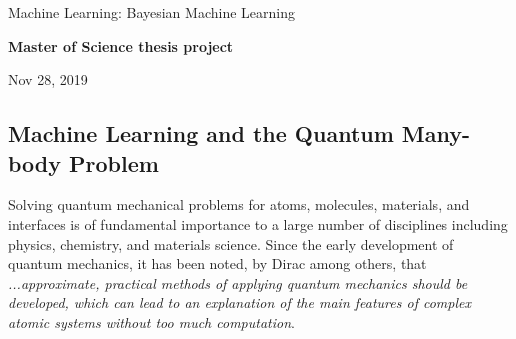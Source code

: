 \documentclass[%
oneside,                 %
final,                   %
10pt]{article}
\begin{document}

\newcommand{\exercisesection}[1]{\subsection*{#1}}






\thispagestyle{empty}

\begin{center}
{\LARGE\bf
\begin{spacing}{1.25}
Machine Learning: Bayesian Machine Learning
\end{spacing}
}
\end{center}


\begin{center}
{\bf Master of Science thesis project${}^{}$} \\ [0mm]
\end{center}

\begin{center}
\end{center}
    

\begin{center}
Nov 28, 2019
\end{center}

\vspace{1cm}


\subsection*{Machine Learning and the Quantum Many-body Problem}

Solving quantum mechanical problems for atoms,  molecules, materials, and
interfaces is of fundamental importance to a large number of
disciplines including physics, chemistry, and materials science. Since
the early development of quantum mechanics, it has been noted, by
Dirac among others, that \emph{...approximate, practical methods of applying quantum mechanics should be developed, which can lead to an explanation of the main features of complex atomic systems without too much computation}. 
\end{document}

